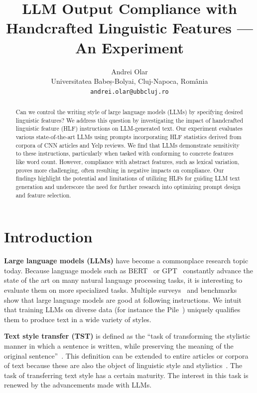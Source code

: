 \documentclass[11pt]{article}
\title{LLM Output Compliance with Handcrafted Linguistic Features --- An Experiment}
\author{Andrei Olar\\
Universitatea Babeș-Bolyai, Cluj-Napoca, România\\
\texttt{andrei.olar@ubbcluj.ro}\\}
\begin{document}
\maketitle
\begin{abstract}
    Can we control the writing style of large language models (LLMs) by specifying
    desired linguistic features?
    We address this question by investigating the impact of handcrafted linguistic
    feature (HLF) instructions on LLM-generated text.
    Our experiment evaluates various state-of-the-art LLMs using prompts
    incorporating HLF statistics derived from corpora of CNN articles and Yelp
    reviews.
    We find that LLMs demonstrate sensitivity to these instructions, particularly
    when tasked with conforming to concrete features like word count.
    However, compliance with abstract features, such as lexical variation, proves
    more challenging, often resulting in negative impacts on compliance.
    Our findings highlight the potential and limitations of utilizing HLFs for
    guiding LLM text generation and underscore the need for further research into
    optimizing prompt design and feature selection.
\end{abstract}


\section{Introduction}\label{introduction}

\textbf{Large language models (LLMs)} have become a commonplace research topic
today.
Because language models such as BERT~\cite{devlin2018bert} or
GPT~\cite{gpt-2018,gpt2-2019,gpt3-2020} constantly advance the state of the art
on many natural language processing tasks, it is interesting to evaluate them on
more specialized tasks.
Multiple surveys~\cite{minaee2024llmsurvey,zhao2023survey} and
benchmarks~\cite{papcode2024hellaswag,chiang2024chatbot} show that large
language models are good at following instructions.
We intuit that training LLMs on diverse data (for instance the
Pile~\cite{gao2020pile}) uniquely qualifies them to produce text in a wide
variety of styles.

\textbf{Text style transfer (TST)} is defined as the ``task of transforming the
stylistic manner in which a sentence is written, while preserving the meaning of
the original sentence''~\cite{tst-review-2021}.
This definition can be extended to entire articles or corpora of text because
these are also the object of linguistic style and
stylistics~\cite{lugea2023stylistics}.
The task of transferring text style has a certain maturity.
The interest in this task is renewed by the advancements made with LLMs.
\end{document}
